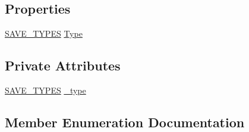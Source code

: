 \subsection*{Properties}
\begin{DoxyCompactItemize}
\item 
\hyperlink{class_web_analyzer_1_1_events_1_1_trigger_save_event_a4eec94af974a1711b6e32010e3e54c0d}{S\+A\+V\+E\+\_\+\+T\+Y\+P\+E\+S} \hyperlink{class_web_analyzer_1_1_events_1_1_trigger_save_event_af54a984dcddf28a5f41eb60d11b3d1b1}{Type}
\end{DoxyCompactItemize}
\subsection*{Private Attributes}
\begin{DoxyCompactItemize}
\item 
\hyperlink{class_web_analyzer_1_1_events_1_1_trigger_save_event_a4eec94af974a1711b6e32010e3e54c0d}{S\+A\+V\+E\+\_\+\+T\+Y\+P\+E\+S} \hyperlink{class_web_analyzer_1_1_events_1_1_trigger_save_event_a6aaef578884f9bcf3fd28d999bdb53a3}{\+\_\+type}
\end{DoxyCompactItemize}


\subsection{Member Enumeration Documentation}
\hypertarget{class_web_analyzer_1_1_events_1_1_trigger_save_event_a4eec94af974a1711b6e32010e3e54c0d}{}

